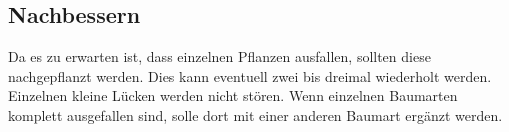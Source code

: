 \documentclass[twocolumn]{scrartcl}
\begin{document}
\subsection{Nachbessern}

Da es zu erwarten ist, dass einzelnen Pflanzen ausfallen, sollten diese
nachgepflanzt werden. Dies kann eventuell zwei bis dreimal wiederholt werden.
Einzelnen kleine Lücken werden nicht stören. Wenn einzelnen Baumarten komplett
ausgefallen sind, solle dort mit einer anderen Baumart ergänzt werden.





\end{document}
